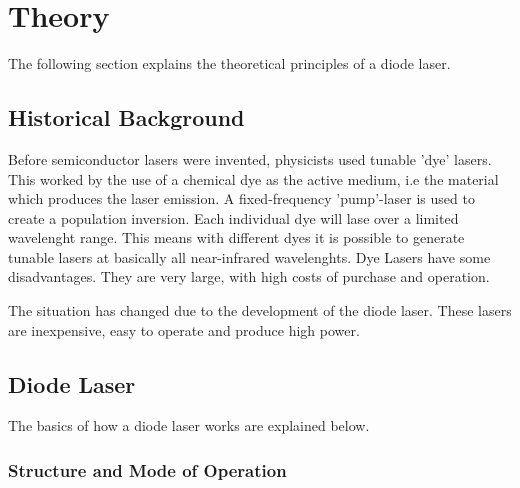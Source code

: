 \section[Theory]{Theory \textnormal{\cite{diode_laser}}}
\label{sec:theory}

The following section explains the theoretical principles of a diode laser.

\subsection{Historical Background}
\label{sec:Historical Background}

Before semiconductor lasers were invented, physicists used tunable 'dye' lasers.
This worked by the use of a chemical dye as the active medium, i.e the material which produces the laser emission.
A fixed-frequency 'pump'-laser is used to create a population inversion. Each individual dye will lase over a limited wavelenght range.
This means with different dyes it is possible to generate tunable lasers at basically all near-infrared wavelenghts.
Dye Lasers have some disadvantages. They are very large, with high costs of purchase and operation.

The situation has changed due to the development of the diode laser. These lasers are inexpensive, easy to operate and produce high power.

\subsection{Diode Laser}
\label{sec:Diode Laser}

The basics of how a diode laser works are explained below.

\subsubsection{Structure and Mode of Operation}
\label{Structure and Mode of Operation}


